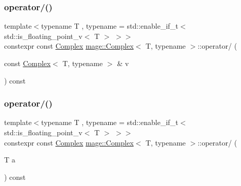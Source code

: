 \subsubsection{\texorpdfstring{operator/()}{operator/()}\hspace{0.1cm}{\footnotesize\ttfamily [1/2]}}
{\footnotesize\ttfamily template$<$typename T , typename  = std\+::enable\+\_\+if\+\_\+t$<$ std\+::is\+\_\+floating\+\_\+point\+\_\+v$<$ T $>$ $>$$>$ \\
constexpr const \mbox{\hyperlink{structmage_1_1_complex}{Complex}} \mbox{\hyperlink{structmage_1_1_complex}{mage\+::\+Complex}}$<$ T, typename $>$\+::operator/ (\begin{DoxyParamCaption}\item[{const \mbox{\hyperlink{structmage_1_1_complex}{Complex}}$<$ T, typename $>$ \&}]{v }\end{DoxyParamCaption}) const\hspace{0.3cm}{\ttfamily [noexcept]}}

\mbox{\label{structmage_1_1_complex_a79e60c33582d854aaa36d58049d3498e}} 
\subsubsection{\texorpdfstring{operator/()}{operator/()}\hspace{0.1cm}{\footnotesize\ttfamily [2/2]}}
{\footnotesize\ttfamily template$<$typename T , typename  = std\+::enable\+\_\+if\+\_\+t$<$ std\+::is\+\_\+floating\+\_\+point\+\_\+v$<$ T $>$ $>$$>$ \\
constexpr const \mbox{\hyperlink{structmage_1_1_complex}{Complex}} \mbox{\hyperlink{structmage_1_1_complex}{mage\+::\+Complex}}$<$ T, typename $>$\+::operator/ (\begin{DoxyParamCaption}\item[{T}]{a }\end{DoxyParamCaption}) const\hspace{0.3cm}{\ttfamily [noexcept]}}

\mbox{\label{structmage_1_1_complex_a3cf18056d27dcddae48a30e221ec7925}} 
